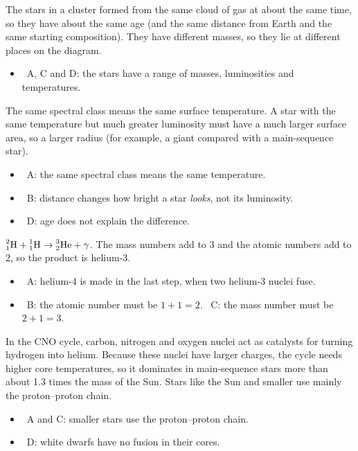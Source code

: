 \documentclass[12pt]{article}
\newcommand\nuc[3]{\ensuremath{\prescript{#1}{#2}{\mathrm{#3}}}}
\begin{document}
\begin{practiceanswers}
\begin{practiceans}
  The stars in a cluster formed from the same cloud of gas at about the same time, so they have about
  the same age (and the same distance from Earth and the same starting composition). They have different
  masses, so they lie at different places on the diagram.
  \begin{itemize}
    \item \xmark\ A, C and D: the stars have a range of masses, luminosities and temperatures.
  \end{itemize}
\end{practiceans}

\begin{practiceans}
  The same spectral class means the same surface temperature. A star with the same temperature but much
  greater luminosity must have a much larger surface area, so a larger radius (for example, a giant
  compared with a main-sequence star).
  \begin{itemize}
    \item \xmark\ A: the same spectral class means the same temperature.
    \item \xmark\ B: distance changes how bright a star \emph{looks}, not its luminosity.
    \item \xmark\ D: age does not explain the difference.
  \end{itemize}
\end{practiceans}

\begin{practiceans}
  $\nuc{2}{1}{H} + \nuc{1}{1}{H} \rightarrow \nuc{3}{2}{He} + \gamma$. The mass numbers add to 3 and the
  atomic numbers add to 2, so the product is helium-3.
  \begin{itemize}
    \item \xmark\ A: helium-4 is made in the last step, when two helium-3 nuclei fuse.
    \item \xmark\ B: the atomic number must be $1 + 1 = 2$. \quad \xmark\ C: the mass number must be
          $2 + 1 = 3$.
  \end{itemize}
\end{practiceans}

\begin{practiceans}
  In the CNO cycle, carbon, nitrogen and oxygen nuclei act as catalysts for turning hydrogen into helium.
  Because these nuclei have larger charges, the cycle needs higher core temperatures, so it dominates in
  main-sequence stars more than about 1.3 times the mass of the Sun. Stars like the Sun and smaller use
  mainly the proton--proton chain.
  \begin{itemize}
    \item \xmark\ A and C: smaller stars use the proton--proton chain.
    \item \xmark\ D: white dwarfs have no fusion in their cores.
  \end{itemize}
\end{practiceans}


\end{practiceanswers}
\end{document}
